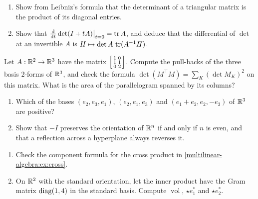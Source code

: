 \begin{notechapter}
\begin{exercise}\label{multilinear-algebra:exr:6}
\begin{enumerate}[nosep]
  \item Show from Leibniz's formula that the determinant of a
        triangular matrix is the product of its diagonal entries.
  \item Show that $\frac{\mathrm{d}}{\mathrm{d} t}\det(I + tA)\big|_{t=0} = \operatorname{tr} A$, and
        deduce that the differential of $\det$ at an invertible $A$ is
        $H\mapsto\det A\,\operatorname{tr}(A^{-1}H)$.
\end{enumerate}
\end{exercise}

\begin{exercise}\label{multilinear-algebra:exr:7}
Let $A:\mathbb{R}^2\to\mathbb{R}^3$ have the matrix
$\begin{bsmallmatrix}1 & 0\\ 1 & 1\\ 0 & 2\end{bsmallmatrix}$. Compute
the pull-backs of the three basis $2$-forms of $\mathbb{R}^3$, and check the
formula $\det(M^\top M) = \sum_K(\det M_K)^2$ on this matrix. What is
the area of the parallelogram spanned by its columns?
\end{exercise}

\begin{exercise}\label{multilinear-algebra:exr:8}
\begin{enumerate}[nosep]
  \item Which of the bases $(e_2, e_3, e_1)$, $(e_2, e_1, e_3)$ and
        $(e_1 + e_2, e_2, -e_3)$ of $\mathbb{R}^3$ are positive?
  \item Show that $-I$ preserves the orientation of $\mathbb{R}^n$ if and only
        if $n$ is even, and that a reflection across a hyperplane always
        reverses it.
\end{enumerate}
\end{exercise}

\begin{exercise}\label{multilinear-algebra:exr:9}
\begin{enumerate}[nosep]
  \item Check the component formula for the cross product in
        \cref{multilinear-algebra:ex:cross}.
  \item On $\mathbb{R}^2$ with the standard orientation, let the inner product
        have the Gram matrix $\operatorname{diag}(1, 4)$ in the standard basis.
        Compute $\operatorname{vol}$, $\star e_1^*$ and $\star e_2^*$.
\end{enumerate}
\end{exercise}
\end{notechapter}

